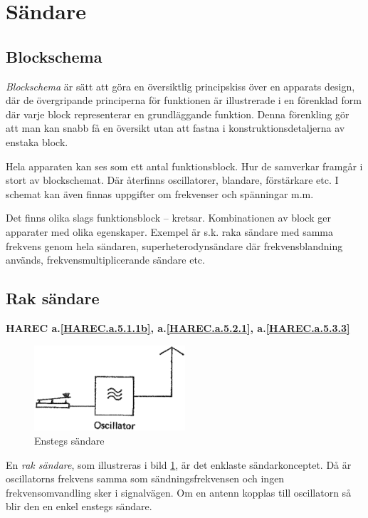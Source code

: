 \section{Sändare}
\label{sändare}

\subsection{Blockschema}

\emph{Blockschema} är sätt att göra en översiktlig principskiss över en
apparats design, där de övergripande principerna för funktionen är illustrerade
i en förenklad form där varje block representerar en grundläggande funktion.
Denna förenkling gör att man kan snabb få en översikt utan att fastna i
konstruktionsdetaljerna av enstaka block.

Hela apparaten kan ses som ett antal funktionsblock. Hur de samverkar
framgår i stort av blockschemat.
Där återfinns oscillatorer, blandare, förstärkare etc.
I schemat kan även finnas uppgifter om frekvenser och spänningar m.m.

Det finns olika slags funktionsblock -- kretsar. Kombinationen av block
ger apparater med olika egenskaper.
Exempel är s.k. raka sändare med samma frekvens genom hela sändaren,
superheterodynsändare där frekvensblandning används,
frekvensmultiplicerande sändare etc.

\subsection{Rak sändare}
\textbf{HAREC
  a.\ref{HAREC.a.5.1.1b}\label{myHAREC.a.5.1.1b},
  a.\ref{HAREC.a.5.2.1}\label{myHAREC.a.5.2.1},
  a.\ref{HAREC.a.5.3.3}\label{myHAREC.a.5.3.3}
}

\begin{figure}
  \includegraphics[width=0.5\textwidth]{images/cropped_pdfs/bild_2_5-01.pdf}
  \caption{Enstegs sändare}
  \label{fig:bildII5-1}
\end{figure}

En \emph{rak sändare}, som illustreras i bild \ref{fig:bildII5-1}, är det
enklaste sändarkonceptet.
Då är oscillatorns frekvens samma som sändningsfrekvensen och ingen
frekvensomvandling sker i signalvägen.
Om en antenn kopplas till oscillatorn så blir den en enkel enstegs sändare.

